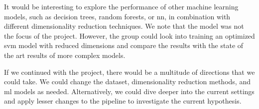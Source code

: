 It would be interesting to explore the performance of other machine learning models, such as decision trees, random forests, or \gls{nn}, in combination with different dimensionality reduction techniques. We note that the model was not the focus of the project. However, the group could look into training an optimized \gls{svm} model with reduced dimensions and compare the results with the state of the art results of more complex models.


If we continued with the project, there would be a multitude of directions that we could take. We could change the dataset, dimensionality reduction methods, and \gls{ml} models as needed. Alternatively, we could dive deeper into the current settings and apply lesser changes to the pipeline to investigate the current hypothesis.









